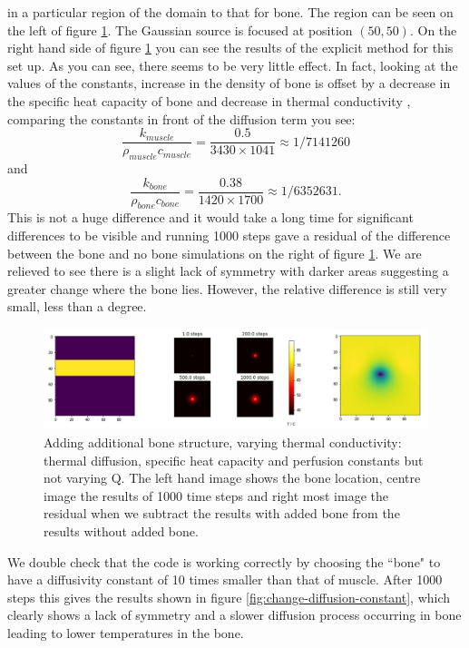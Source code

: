 \documentclass[11pt]{article} %
\begin{document}
in a particular region of the domain to that for bone. The region can be seen on the left of figure \ref{fig:bone-without-changing-q}. The Gaussian source is focused at position $(50,50)$. 
On the right hand side of figure \ref{fig:bone-without-changing-q} you can see the results of the explicit method for this set up. As you can see,  there seems to be very little effect. In fact, looking at the values of the constants,  increase in the density of bone is offset by a decrease in the specific heat capacity of bone and decrease in thermal conductivity , comparing the constants in front of the diffusion term you see:  \begin{equation}
\frac{k_{muscle}}{\rho_{muscle} c_{muscle}} = \frac{0.5}{3430 \times 1041} \approx 1/7141260 \label{apples}
\end{equation}  and \begin{equation}
\frac{k_{bone}}{\rho_{bone} c_{bone}} =\frac{0.38}{ 1420 \times 1700} \approx 1/ 6352631. \label{bananas}
\end{equation}This is not a huge difference and it would take a long time for significant differences to be visible and running 1000 steps gave a residual of the difference between the bone and no bone simulations on the right of figure \ref{fig:bone-without-changing-q}. We are relieved to see there is a slight lack of symmetry with darker areas suggesting a greater change where the bone lies. However, the relative difference is still very small, less than a degree.

\begin{figure}
	\centering
	\includegraphics[width=\linewidth]{"Report_images/bone without changing Q"}
	\caption{Adding additional bone structure, varying thermal conductivity: thermal diffusion, specific heat capacity and perfusion constants but not varying Q. The left hand image shows the bone location, centre image the results of 1000 time steps and right most image the residual when we subtract the results with added bone from the results without added bone.  }
	\label{fig:bone-without-changing-q}
\end{figure}

We double check that the code is working correctly by  choosing the ``bone" to have a diffusivity constant of 10 times smaller than that of muscle. After 1000 steps this gives the results shown in figure \ref{fig:change-diffusion-constant}, which clearly shows a lack of symmetry and a slower diffusion process occurring in bone leading to lower temperatures in the bone. 
\end{document}
